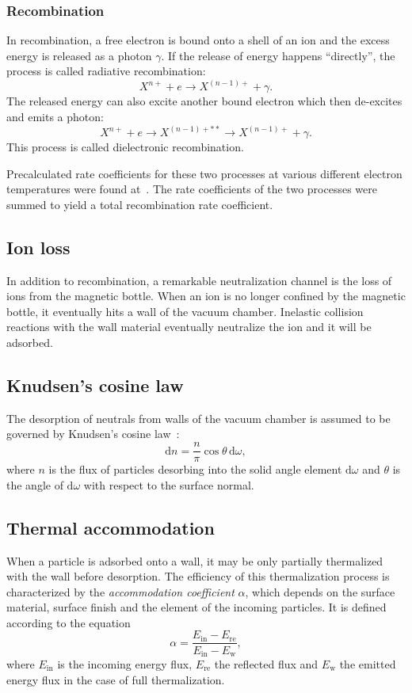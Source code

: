 \documentclass[a4paper,twoside,12pt]{article}
\begin{document}
\subsubsection{Recombination}
In recombination, a free electron is bound onto a shell of an ion and the excess energy is released as a photon $\gamma$. If the release of energy happens ``directly'', the process is called radiative recombination:
\[
    X^{n+} + e \rightarrow X^{(n-1)+} + \gamma.
\]
The released energy can also excite another bound electron which then de-excites and emits a photon:
\[
    X^{n+} + e \rightarrow X^{(n-1)+**} \rightarrow X^{(n-1)+} + \gamma.
\]
This process is called dielectronic recombination.~\cite{nist:recombination}

Precalculated rate coefficients for these two processes at various different electron temperatures were found at~\cite{iaea:flychk}. The rate coefficients of the two processes were summed to yield a total recombination rate coefficient.

\subsection{Ion loss}
In addition to recombination, a remarkable neutralization channel is the loss
of ions from the magnetic bottle. When an ion is no longer confined by the
magnetic bottle, it eventually hits a wall of the vacuum chamber. Inelastic
collision reactions with the wall material eventually neutralize the ion and it
will be adsorbed.

\subsection{Knudsen's cosine law}
The desorption of neutrals from walls of the vacuum chamber is assumed to be governed by Knudsen's cosine law~\cite{knudsen:cosine}:
\begin{equation}
    \mathrm{d}n = \frac{n}{\pi}\cos\theta \,\mathrm{d}\omega,
\end{equation}
where $n$ is the flux of particles desorbing into the solid angle element $\mathrm{d}\omega$ and $\theta$ is the angle of $\mathrm{d}\omega$ with respect to the surface normal.

\subsection{Thermal accommodation}
When a particle is adsorbed onto a wall, it may be only partially thermalized with the wall before desorption. The efficiency of this thermalization process is characterized by the \emph{accommodation coefficient} $\alpha$, which depends on the surface material, surface finish and the element of the incoming particles. It is defined according to the equation
\begin{equation}
    \alpha = \frac{E_\text{in} - E_\text{re}}{E_\text{in} - E_\text{w}},
\end{equation}
where $E_\text{in}$ is the incoming energy flux, $E_\text{re}$ the reflected flux and $E_\text{w}$ the emitted energy flux in the case of full thermalization.~\cite{sandia:accom}
\end{document}
